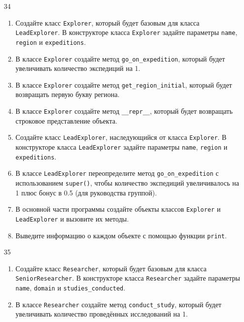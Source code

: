 \begin{enumerate}
\item[34] 
\begin{enumerate}[leftmargin=*]
    \item Создайте класс \texttt{Explorer}, который будет базовым для класса \texttt{LeadExplorer}. В конструкторе класса \texttt{Explorer} задайте параметры \texttt{name}, \texttt{region} и \texttt{expeditions}.
    
    \item В классе \texttt{Explorer} создайте метод \texttt{go\_on\_expedition}, который будет увеличивать количество экспедиций на 1.
    
    \item В классе \texttt{Explorer} создайте метод \texttt{get\_region\_initial}, который будет возвращать первую букву региона.
    
    \item В классе \texttt{Explorer} создайте метод \texttt{\_\_repr\_\_}, который будет возвращать строковое представление объекта.
    
    \item Создайте класс \texttt{LeadExplorer}, наследующийся от класса \texttt{Explorer}. В конструкторе класса \texttt{LeadExplorer} задайте параметры \texttt{name}, \texttt{region} и \texttt{expeditions}.
    
    \item В классе \texttt{LeadExplorer} переопределите метод \texttt{go\_on\_expedition} с использованием \texttt{super()}, чтобы количество экспедиций увеличивалось на 1 плюс бонус в 0.5 (для руководства группой).
    
    \item В основной части программы создайте объекты классов \texttt{Explorer} и \texttt{LeadExplorer} и вызовите их методы.
    
    \item Выведите информацию о каждом объекте с помощью функции \texttt{print}.
\end{enumerate}

\item[35] 
\begin{enumerate}[leftmargin=*]
    \item Создайте класс \texttt{Researcher}, который будет базовым для класса \texttt{SeniorResearcher}. В конструкторе класса \texttt{Researcher} задайте параметры \texttt{name}, \texttt{domain} и \texttt{studies\_conducted}.
    
    \item В классе \texttt{Researcher} создайте метод \texttt{conduct\_study}, который будет увеличивать количество проведённых исследований на 1.
    

\end{enumerate}
\end{enumerate}
